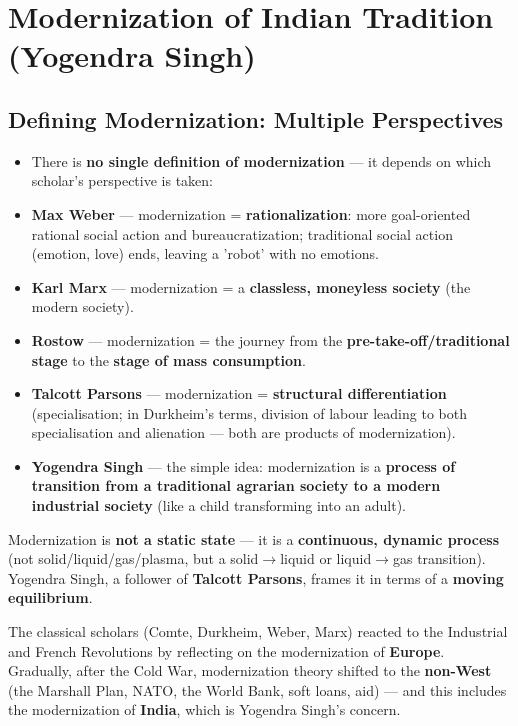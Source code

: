 \chapter{Modernization of Indian Tradition (Yogendra Singh)}

\section{Defining Modernization: Multiple Perspectives}

\begin{KeyConcept}
\begin{itemize}
\item There is \textbf{no single definition of modernization} --- it depends on which scholar's perspective is taken:
\item \textbf{Max Weber} --- modernization = \textbf{rationalization}: more goal-oriented rational social action and bureaucratization; traditional social action (emotion, love) ends, leaving a 'robot' with no emotions.
\item \textbf{Karl Marx} --- modernization = a \textbf{classless, moneyless society} (the modern society).
\item \textbf{Rostow} --- modernization = the journey from the \textbf{pre-take-off/traditional stage} to the \textbf{stage of mass consumption}.
\item \textbf{Talcott Parsons} --- modernization = \textbf{structural differentiation} (specialisation; in Durkheim's terms, division of labour leading to both specialisation and alienation --- both are products of modernization).
\item \textbf{Yogendra Singh} --- the simple idea: modernization is a \textbf{process of transition from a traditional agrarian society to a modern industrial society} (like a child transforming into an adult).
\end{itemize}
\end{KeyConcept}

\begin{KeyConcept}
Modernization is \textbf{not a static state} --- it is a \textbf{continuous, dynamic process} (not solid/liquid/gas/plasma, but a solid$\rightarrow$liquid or liquid$\rightarrow$gas transition). Yogendra Singh, a follower of \textbf{Talcott Parsons}, frames it in terms of a \textbf{moving equilibrium}.
\end{KeyConcept}

The classical scholars (Comte, Durkheim, Weber, Marx) reacted to the Industrial and French Revolutions by reflecting on the modernization of \textbf{Europe}. Gradually, after the Cold War, modernization theory shifted to the \textbf{non-West} (the Marshall Plan, NATO, the World Bank, soft loans, aid) --- and this includes the modernization of \textbf{India}, which is Yogendra Singh's concern.

